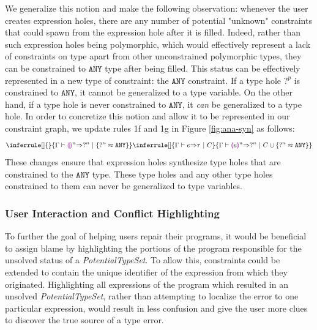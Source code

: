 We generalize this notion and make the following observation: whenever the user creates expression holes, there are any number of potential "unknown" constraints that could spawn from the expression hole after it is filled. Indeed, rather than such expression holes being polymorphic, which would effectively represent a lack of constraints on type apart from other unconstrained polymorphic types, they can be constrained to $\mathtt{ANY}$ type after being filled. This status can be effectively represented in a new type of constraint: the $\mathtt{ANY}$ constraint. If a type hole $?^p$ is constrained to $\mathtt{ANY}$, it cannot be generalized to a type variable. On the other hand, if a type hole is never constrained to $\mathtt{ANY}$, it \emph{can} be generalized to a type hole. In order to concretize this notion and allow it to be represented in our constraint graph, we update rules 1f and 1g in Figure \ref{fig:ana-syn} as follows:
\begin{equation}
    \inferrule[]{ }{
        \consexptyp{\Gamma}{\llparenthesiscolor \rrparenthesiscolor^n}{\tehole^n}{\{ \tehole^n \approx \mathtt{ANY} \}}
      }\\
      \inferrule[]{
        \consexptyp{\Gamma}{e}{\tau}{C}
       }{
         \consexptyp{\Gamma}{\llparenthesiscolor e \rrparenthesiscolor^n}{\tehole^n}{C \cup \{ \tehole^n \approx \mathtt{ANY} \}}
       }
\end{equation}
These changes ensure that expression holes synthesize type holes that are constrained to the $\mathtt{ANY}$ type. These type holes and any other type holes constrained to them can never be generalized to type variables.

\subsubsection{User Interaction and Conflict Highlighting}
To further the goal of helping users repair their programs, it would be beneficial to assign blame by highlighting the portions of the program responsible for the unsolved status of a \textit{PotentialTypeSet}. To allow this, constraints could be extended to contain the unique identifier of the expression from which they originated. Highlighting all expressions of the program which resulted in an unsolved \textit{PotentialTypeSet}, rather than attempting to localize the error to one particular expression, would result in less confusion and give the user more clues to discover the true source of a type error.




